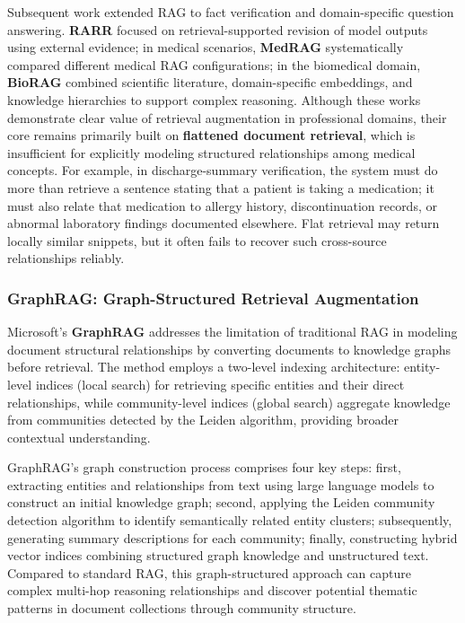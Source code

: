 \documentclass[11pt]{article}
\begin{document}
Subsequent work extended RAG to fact verification and domain-specific question answering. \textbf{RARR} \citep{gao2023rarr} focused on retrieval-supported revision of model outputs using external evidence; in medical scenarios, \textbf{MedRAG} \citep{xiong2024medRAG} systematically compared different medical RAG configurations; in the biomedical domain, \textbf{BioRAG} \citep{wang2024bioRAG} combined scientific literature, domain-specific embeddings, and knowledge hierarchies to support complex reasoning. Although these works demonstrate clear value of retrieval augmentation in professional domains, their core remains primarily built on \textbf{flattened document retrieval}, which is insufficient for explicitly modeling structured relationships among medical concepts. For example, in discharge-summary verification, the system must do more than retrieve a sentence stating that a patient is taking a medication; it must also relate that medication to allergy history, discontinuation records, or abnormal laboratory findings documented elsewhere. Flat retrieval may return locally similar snippets, but it often fails to recover such cross-source relationships reliably.

\subsubsection{GraphRAG: Graph-Structured Retrieval Augmentation}

Microsoft's \textbf{GraphRAG} \citep{edge2024graphRAGSummarization} addresses the limitation of traditional RAG in modeling document structural relationships by converting documents to knowledge graphs before retrieval. The method employs a two-level indexing architecture: entity-level indices (local search) for retrieving specific entities and their direct relationships, while community-level indices (global search) aggregate knowledge from communities detected by the Leiden algorithm, providing broader contextual understanding.

GraphRAG's graph construction process comprises four key steps: first, extracting entities and relationships from text using large language models to construct an initial knowledge graph; second, applying the Leiden community detection algorithm to identify semantically related entity clusters; subsequently, generating summary descriptions for each community; finally, constructing hybrid vector indices combining structured graph knowledge and unstructured text. Compared to standard RAG, this graph-structured approach can capture complex multi-hop reasoning relationships and discover potential thematic patterns in document collections through community structure.
\end{document}
